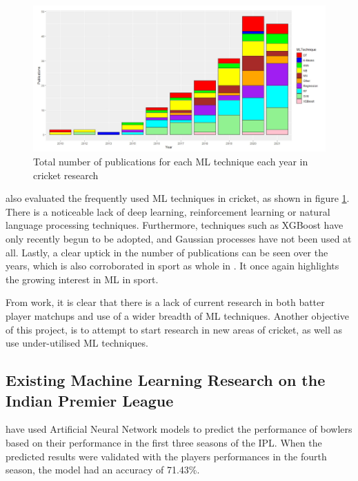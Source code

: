 \documentclass[12pt,a4paper]{report}
\theoremstyle{definition}
\begin{document}
\begin{figure}[H]
    \centering
    \includegraphics[width=\linewidth]{ML_techniques_cricket.png}
    \caption{Total number of publications for each ML technique each year in cricket research \citep{Wickramasinghe2022}}
    \label{fig:NoPapersCricket}
\end{figure}

\citet{Wickramasinghe2022} also evaluated the frequently used ML techniques in cricket, as shown in figure \ref{fig:NoPapersCricket}. 
There is a noticeable lack of deep learning, reinforcement learning or natural language processing techniques.
Furthermore, techniques such as XGBoost have only recently begun to be adopted, and Gaussian processes have not been used at all.
Lastly, a clear uptick in the number of publications can be seen over the years, which is also corroborated in sport as whole in \citet{horvat2020}.
It once again highlights the growing interest in ML in sport.

From \citet{Wickramasinghe2022} work, it is clear that there is a lack of current research in both batter player matchups and use of a wider breadth of ML techniques. 
Another objective of this project, is to attempt to start research in new areas of cricket, as well as use under-utilised  ML techniques.

\subsection{Existing Machine Learning Research on the Indian Premier League}

\citet{Saikia2012} have used Artificial Neural Network models to predict the performance of bowlers based on their performance in the first three seasons of the IPL. 
When the predicted results were validated with the players performances in the fourth season, the model had an accuracy of 71.43\%.
\end{document}
